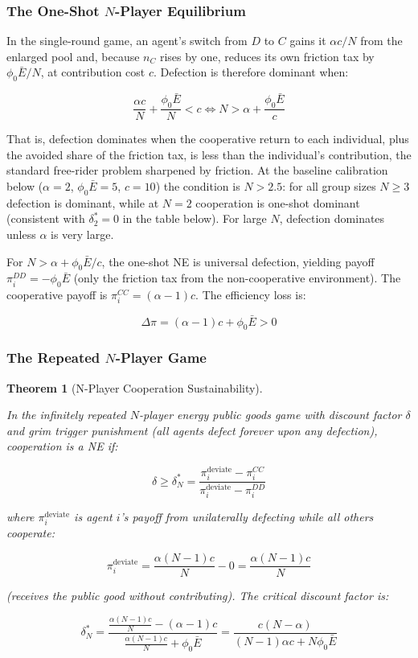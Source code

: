 \documentclass[11pt]{article}
\theoremstyle{plain}
\newtheorem{theorem}{Theorem}
\theoremstyle{definition}
\theoremstyle{remark}
\let\origsubsubsection\subsubsection
\renewcommand{\subsubsection}{\needspace{4\baselineskip}\origsubsubsection}
\begin{document}
\subsubsection{\texorpdfstring{The One-Shot \(N\)-Player
Equilibrium}{The One-Shot N-Player Equilibrium}}\label{the-one-shot-n-player-equilibrium}

In the single-round game, an agent's switch from \(D\) to \(C\) gains it
\(\alpha c/N\) from the enlarged pool and, because \(n_C\) rises by one,
reduces its own friction tax by \(\phi_0 \bar{E}/N\), at contribution
cost \(c\). Defection is therefore dominant when:

\[\frac{\alpha c}{N} + \frac{\phi_0 \bar{E}}{N} < c \iff N > \alpha + \frac{\phi_0 \bar{E}}{c}\]

That is, defection dominates when the cooperative return to each
individual, plus the avoided share of the friction tax, is less than the
individual's contribution, the standard free-rider problem sharpened by
friction. At the baseline calibration below (\(\alpha = 2\),
\(\phi_0\bar{E} = 5\), \(c = 10\)) the condition is \(N > 2.5\): for all
group sizes \(N \geq 3\) defection is dominant, while at \(N = 2\)
cooperation is one-shot dominant (consistent with \(\delta_2^* = 0\) in
the table below). For large \(N\), defection dominates unless \(\alpha\)
is very large.

For \(N > \alpha + \phi_0\bar{E}/c\), the one-shot NE is universal
defection, yielding payoff \(\pi_i^{DD} = -\phi_0 \bar{E}\) (only the
friction tax from the non-cooperative environment). The cooperative
payoff is \(\pi_i^{CC} = (\alpha - 1)c\). The efficiency loss is:

\[\Delta\pi = (\alpha - 1)c + \phi_0 \bar{E} > 0\]

\subsubsection{\texorpdfstring{The Repeated \(N\)-Player
Game}{The Repeated N-Player Game}}\label{the-repeated-n-player-game}

\begin{theorem}[N-Player Cooperation Sustainability]
\label{thm-n-player-cooperation}

In the infinitely repeated $N$-player energy public goods game with discount factor $\delta$ and grim trigger punishment (all agents defect forever upon any defection), cooperation is a NE if:

$$\delta \geq \delta_N^* = \frac{\pi_i^{\text{deviate}} - \pi_i^{CC}}{\pi_i^{\text{deviate}} - \pi_i^{DD}}$$

where $\pi_i^{\text{deviate}}$ is agent $i$'s payoff from unilaterally defecting while all others cooperate:

$$\pi_i^{\text{deviate}} = \frac{\alpha (N-1) c}{N} - 0 = \frac{\alpha(N-1)c}{N}$$

(receives the public good without contributing). The critical discount factor is:

$$\delta_N^* = \frac{\frac{\alpha(N-1)c}{N} - (\alpha - 1)c}{\frac{\alpha(N-1)c}{N} + \phi_0 \bar{E}} = \frac{c(N - \alpha)}{(N-1)\alpha c + N\phi_0\bar{E}}$$
\end{theorem}
\end{document}
